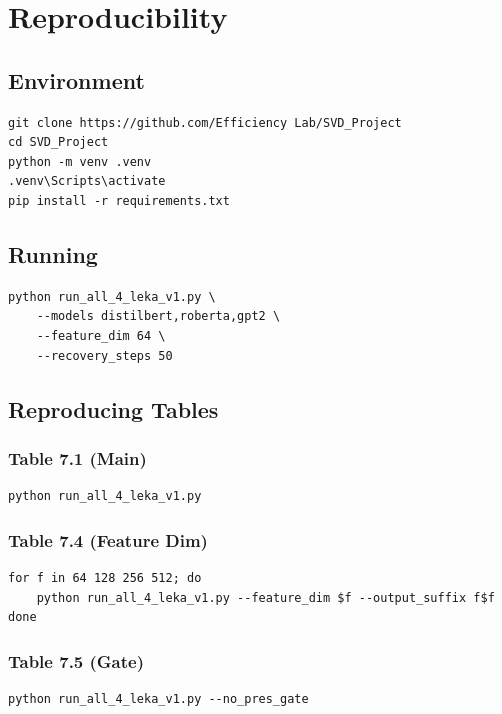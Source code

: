\section{Reproducibility}

\subsection{Environment}

\begin{lstlisting}
git clone https://github.com/Efficiency Lab/SVD_Project
cd SVD_Project
python -m venv .venv
.venv\Scripts\activate
pip install -r requirements.txt
\end{lstlisting}

\subsection{Running}

\begin{lstlisting}
python run_all_4_leka_v1.py \
    --models distilbert,roberta,gpt2 \
    --feature_dim 64 \
    --recovery_steps 50
\end{lstlisting}

\subsection{Reproducing Tables}

\subsubsection{Table 7.1 (Main)}
\begin{lstlisting}
python run_all_4_leka_v1.py
\end{lstlisting}

\subsubsection{Table 7.4 (Feature Dim)}
\begin{lstlisting}
for f in 64 128 256 512; do
    python run_all_4_leka_v1.py --feature_dim $f --output_suffix f$f
done
\end{lstlisting}

\subsubsection{Table 7.5 (Gate)}
\begin{lstlisting}
python run_all_4_leka_v1.py --no_pres_gate
\end{lstlisting}

